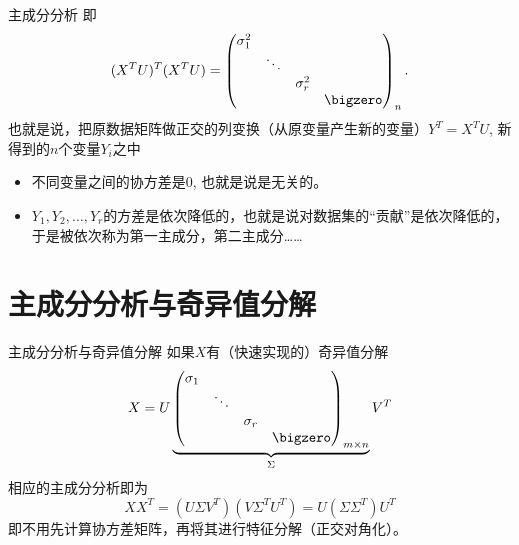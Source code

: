
\begin{frame}

\begin{block}{主成分分析}
即
\[(X^TU)^T (X^TU) = \begin{pmatrix} \sigma_1^2 & & & \\ & \ddots & & \\ & & \sigma_r^2 & \\ & & & \bigzero \end{pmatrix}_n.\]
也就是说，把原数据矩阵做正交的列变换（从原变量产生新的变量）$Y^T = X^TU$, 新得到的$n$个变量$Y_i$之中
\begin{itemize}
\item 不同变量之间的协方差是$0$, 也就是说是无关的。
\item $Y_1,Y_2,\ldots,Y_r$的方差是依次降低的，也就是说对数据集的``贡献''是依次降低的，于是被依次称为第一主成分，第二主成分……
\end{itemize}
\end{block}

\end{frame}


\section{主成分分析与奇异值分解}


\begin{frame}

\begin{block}{主成分分析与奇异值分解}
如果$X$有（快速实现的）奇异值分解
\[X = U \underbrace{\begin{pmatrix} \sigma_1 & & & \\ & \ddots & & \\ & & \sigma_r & \\ & & & \bigzero \end{pmatrix}_{m\times n}}_{\Sigma} V^T\]
相应的主成分分析即为
\[XX^T = (U\Sigma V^T) (V\Sigma^T U^T) = U (\Sigma\Sigma^T) U^T\]
即不用先计算协方差矩阵，再将其进行特征分解（正交对角化）。
\end{block}

\end{frame}



